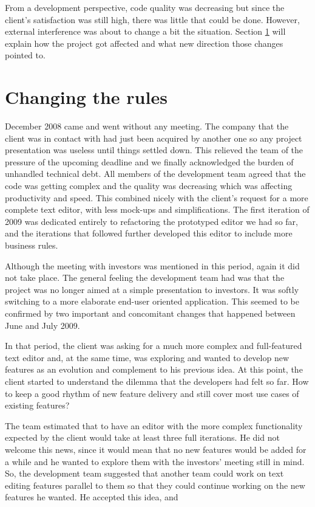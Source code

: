 \documentclass[lnbip]{svmultln}
\begin{document}
From a development perspective, code quality was decreasing but since
the client's satisfaction was still high, there was little that could be done.
However, external interference was about to change a bit the situation. Section
\ref{sec:changes} will explain how the project got affected and what new
direction those changes pointed to.

\section{Changing the rules}
\label{sec:changes}

December 2008 came and went without any meeting. The company that the client was
in contact with had just been acquired by another one so any project
presentation was useless until things settled down. This relieved the team of
the pressure of the upcoming deadline and we finally acknowledged the burden of
unhandled technical debt. All members of the development team agreed that the
code was getting complex and the quality was decreasing which was affecting
productivity and speed. This combined nicely with the client's request for a
more complete text editor, with less mock-ups and simplifications. The first
iteration of 2009 was dedicated entirely to refactoring the prototyped editor we
had so far, and the iterations that followed further developed this editor to
include more business rules.

Although the meeting with investors was mentioned in this period, again it did
not take place. The general feeling the development team had was that the
project was no longer aimed at a simple presentation to investors. It was softly
switching to a more elaborate end-user oriented application. This seemed to be
confirmed by two important and concomitant changes that happened between June
and July 2009.

In that period, the client was asking for a much more complex and full-featured text editor and, at the same time, was exploring and wanted to develop new features as an evolution and complement to his previous idea. At this point, the client started to understand the dilemma that the developers had felt so far. How to keep a good rhythm of new feature delivery and still cover most use cases of existing features?

The team estimated that to have an editor with the more complex functionality expected by the client would take at least three full iterations. He did not welcome this news, since it would mean that no new features would be added for a while and he wanted to explore them with the investors' meeting still in mind. So, the development team suggested that another team could work on text editing features parallel to them so that they could continue working on the new features he wanted. He accepted this idea, and
\end{document}
